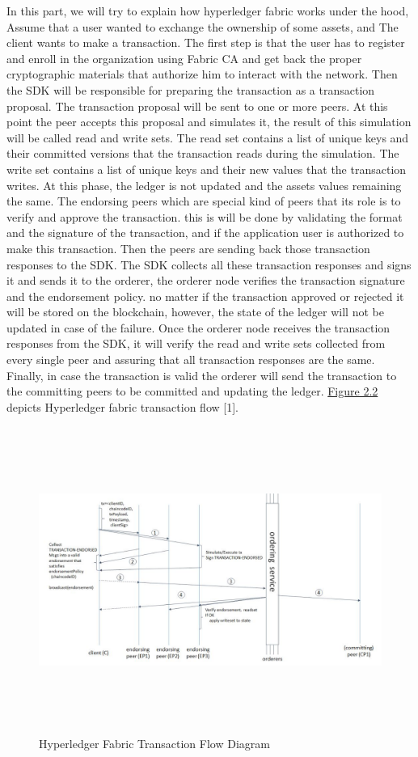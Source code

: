 In this part, we will try to explain how hyperledger fabric works under the hood,
Assume that a user  wanted to exchange the ownership of some assets, and The client wants to make a transaction. 
The first step is that the user has to register and enroll in the organization using Fabric CA and get back the proper cryptographic materials that authorize him to interact with the network. Then the SDK will be responsible for preparing the transaction as a transaction proposal. 
The transaction proposal will be sent to one or more peers. At this point the peer accepts this proposal and simulates it, the result of this simulation will be called read and write sets. The read set contains a list of unique keys and their committed versions that the transaction reads during the simulation. The write set contains a list of unique keys and their new values that the transaction writes. At this phase, the ledger is not updated and the assets values remaining the same. 
The endorsing peers which are special kind of peers that its role is to verify and approve the transaction. this is will be done by validating the format and the signature of the transaction, and if the application user is authorized to make this transaction. 
Then the peers are sending back those transaction responses to the SDK. The SDK collects all these transaction responses and signs it and sends it to the orderer, the orderer node verifies the transaction signature and the endorsement policy. no matter if the transaction approved or rejected it will be stored on the blockchain, however, the state of the ledger will not be updated in case of the failure. Once the orderer node receives the transaction responses from the SDK, it will verify the read and write sets collected from every single peer and assuring that all transaction responses are the same. 
Finally, in case the transaction is valid the orderer will send the transaction to the committing peers to be committed and updating the ledger.
\hyperref[fig:transactionflow]{Figure 2.2} depicts Hyperledger fabric transaction flow [1]. 
\begin{figure}[H]
	\includegraphics[width=15cm,height=10cm]{images/transactionflow.jpg}
	\caption{Hyperledger Fabric Transaction Flow Diagram}
	\label{fig:transactionflow}
	\end{figure}

